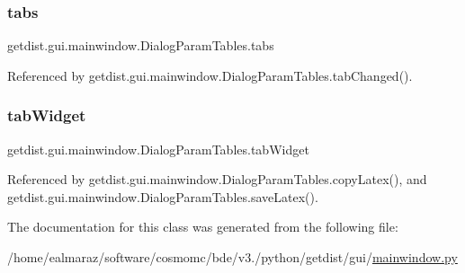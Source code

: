 \subsubsection{\texorpdfstring{tabs}{tabs}}
{\footnotesize\ttfamily getdist.\+gui.\+mainwindow.\+Dialog\+Param\+Tables.\+tabs}



Referenced by getdist.\+gui.\+mainwindow.\+Dialog\+Param\+Tables.\+tab\+Changed().

\mbox{\label{classgetdist_1_1gui_1_1mainwindow_1_1DialogParamTables_a0968575b3a5f92c9fc98e7515ed232a5}} 
\subsubsection{\texorpdfstring{tab\+Widget}{tabWidget}}
{\footnotesize\ttfamily getdist.\+gui.\+mainwindow.\+Dialog\+Param\+Tables.\+tab\+Widget}



Referenced by getdist.\+gui.\+mainwindow.\+Dialog\+Param\+Tables.\+copy\+Latex(), and getdist.\+gui.\+mainwindow.\+Dialog\+Param\+Tables.\+save\+Latex().



The documentation for this class was generated from the following file\+:\begin{DoxyCompactItemize}
\item 
/home/ealmaraz/software/cosmomc/bde/v3./python/getdist/gui/\mbox{\hyperlink{mainwindow_8py}{mainwindow.\+py}}\end{DoxyCompactItemize}
